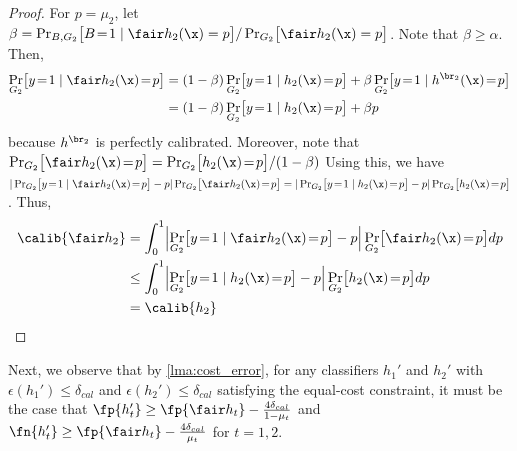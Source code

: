 \begin{proof}
  For $p = \mu_2$, let $\beta = \Pr_{B,G_2}\bigl[B \!=\! 1 \mid \fair h_2(\x) =
  p\bigr]/\Pr_{G_2} \bigl[\fair h_2(\x) = p\bigr]$. Note that $\beta \ge
  \alpha$. Then,
  \begin{align*}
    \Pr_{G_2} \bigl[ y\!=\!1 \mid \fair h_2(\x) \!=\!p \bigr] &=
    (1-\beta) \Pr_{G_2} \bigl[ y\!=\!1 \mid h_2(\x) \!=\!p \bigr] + \beta
    \Pr_{G_2} \bigl[ y\!=\!1 \mid h^{\br_2}(\x) \!=\!p \bigr] \\
    &= (1-\beta) \Pr_{G_2} \bigl[ y\!=\!1 \mid h_2(\x) \!=\!p \bigr] + \beta p
  \end{align*}
  because $h^{\br_2}$ is perfectly calibrated. Moreover, note that $\Pr_{G_2}
  \bigl[ \fair h_2(\x)\!=\!p\bigr] = \Pr_{G_2} \bigl[ h_2(\x)\!=\!p\bigr] /
  (1-\beta)$
  Using this, we have
  $|\Pr_{G_2} \bigl[ y\!=\!1 \mid \fair h_2(\x) \!=\!p
  \bigr] - p | \Pr_{G_2} \bigl[ \fair h_2(\x)\!=\!p\bigr] =
  |\Pr_{G_2} \bigl[ y\!=\!1 \mid h_2(\x) \!=\!p
  \bigr] - p | \Pr_{G_2} \bigl[ h_2(\x)\!=\!p\bigr]$.
  Thus,
  \begin{align*}
    \calib{\fair h_2}
    &= \int_{0}^1 \Bigl\lvert \Pr_{G_2} \bigl[ y\!=\!1 \mid \fair
    h_2(\x) \!=\!p \bigr] - p \Bigr\rvert
    \Pr_{G_2} \bigl[ \fair h_2(\x)\!=\!p\bigr] dp \\
    &\le \int_{0}^1 \Bigl\lvert \Pr_{G_2} \bigl[ y\!=\!1 \mid
    h_2(\x) \!=\!p \bigr] - p \Bigr\rvert
    \Pr_{G_2} \bigl[ h_2(\x)\!=\!p\bigr] dp \\
    &= \calib{h_2}
  \end{align*}
\end{proof}

Next, we observe that by \autoref{lma:cost_error}, for any
classifiers $h_1'$ and $h_2'$ with $\epsilon(h_1') \le \delta_{cal}$ and
$\epsilon(h_2') \le \delta_{cal}$ satisfying the equal-cost constraint, it must be
the case that $\fp{h_t'} \ge \fp{\fair h_t} - \frac{4 \delta_{cal}}{1-\mu_t}$
and $\fn{h_t'} \ge \fp{\fair h_t} - \frac{4 \delta_{cal}}{\mu_t}$ for $t = 1, 2$.

